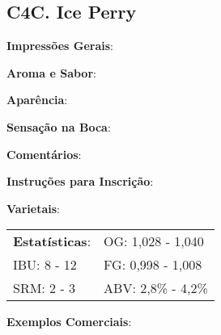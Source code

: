 \subsection*{C4C. Ice Perry}

\textbf{Impressões Gerais}:

\textbf{Aroma e Sabor}:

\textbf{Aparência}:

\textbf{Sensação na Boca}:

\textbf{Comentários}:

\textbf{Instruções para Inscrição}:

\textbf{Varietais}:

\begin{tabular}{@{}p{35mm}p{35mm}@{}}
  \textbf{Estatísticas}: & OG: 1,028 - 1,040 \\
  IBU: 8 - 12  & FG: 0,998 - 1,008 \\
  SRM: 2 - 3  & ABV: 2,8\% - 4,2\%
\end{tabular}

\textbf{Exemplos Comerciais}: